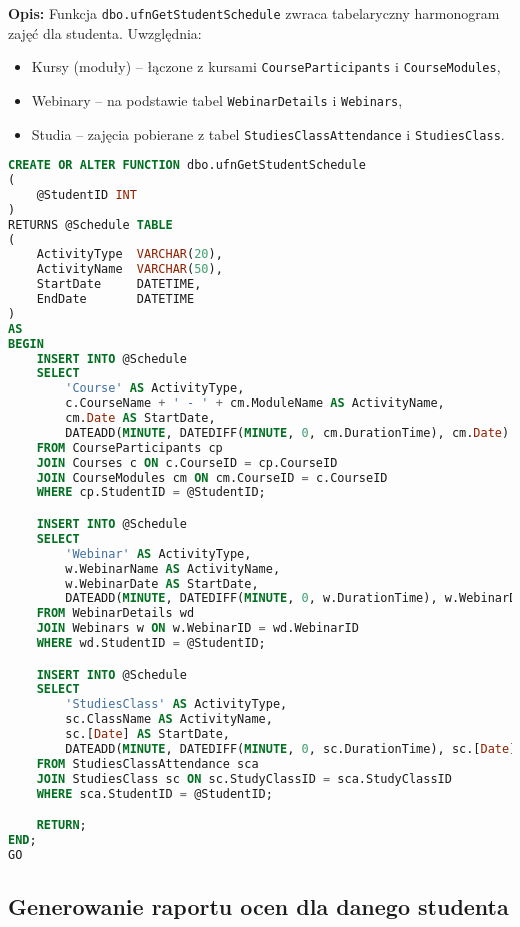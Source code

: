 \documentclass[12pt]{article}
\begin{document}
\textbf{Opis:} Funkcja \texttt{dbo.ufnGetStudentSchedule} zwraca tabelaryczny harmonogram zajęć dla studenta. Uwzględnia:
\begin{itemize}
    \item Kursy (moduły) – łączone z kursami \texttt{CourseParticipants} i \texttt{CourseModules},
    \item Webinary – na podstawie tabel \texttt{WebinarDetails} i \texttt{Webinars},
    \item Studia – zajęcia pobierane z tabel \texttt{StudiesClassAttendance} i \texttt{StudiesClass}.
\end{itemize}

 
\begin{lstlisting}[language=SQL]
CREATE OR ALTER FUNCTION dbo.ufnGetStudentSchedule
(
    @StudentID INT
)
RETURNS @Schedule TABLE
(
    ActivityType  VARCHAR(20),
    ActivityName  VARCHAR(50),
    StartDate     DATETIME,
    EndDate       DATETIME
)
AS
BEGIN
    INSERT INTO @Schedule
    SELECT 
        'Course' AS ActivityType,
        c.CourseName + ' - ' + cm.ModuleName AS ActivityName,
        cm.Date AS StartDate,
        DATEADD(MINUTE, DATEDIFF(MINUTE, 0, cm.DurationTime), cm.Date) AS EndDate
    FROM CourseParticipants cp
    JOIN Courses c ON c.CourseID = cp.CourseID
    JOIN CourseModules cm ON cm.CourseID = c.CourseID
    WHERE cp.StudentID = @StudentID;

    INSERT INTO @Schedule
    SELECT
        'Webinar' AS ActivityType,
        w.WebinarName AS ActivityName,
        w.WebinarDate AS StartDate,
        DATEADD(MINUTE, DATEDIFF(MINUTE, 0, w.DurationTime), w.WebinarDate) AS EndDate
    FROM WebinarDetails wd
    JOIN Webinars w ON w.WebinarID = wd.WebinarID
    WHERE wd.StudentID = @StudentID;

    INSERT INTO @Schedule
    SELECT
        'StudiesClass' AS ActivityType,
        sc.ClassName AS ActivityName,
        sc.[Date] AS StartDate,
        DATEADD(MINUTE, DATEDIFF(MINUTE, 0, sc.DurationTime), sc.[Date]) AS EndDate
    FROM StudiesClassAttendance sca
    JOIN StudiesClass sc ON sc.StudyClassID = sca.StudyClassID
    WHERE sca.StudentID = @StudentID;

    RETURN;
END;
GO
\end{lstlisting}

\subsection{Generowanie raportu ocen dla danego studenta}
\label{sec:student_grades}
\end{document}
